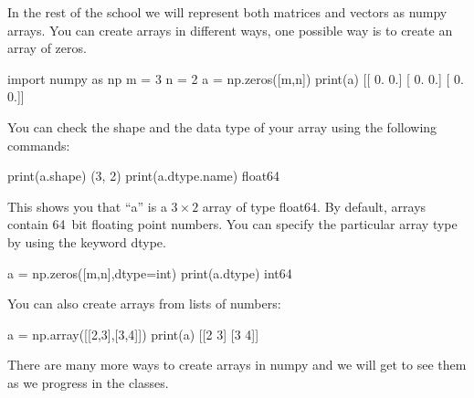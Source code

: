 \begin{exercise}
In the rest of the school we will represent both matrices and vectors as numpy arrays. You can create arrays in different ways, one possible way is to create an array of zeros.
\begin{python}
import numpy as np
m = 3
n = 2
a = np.zeros([m,n])
print(a)
[[ 0.  0.]
 [ 0.  0.]
 [ 0.  0.]]
\end{python}

\noindent You can check the shape and the data type of your array using the following commands:
\begin{python}
print(a.shape)
(3, 2)
print(a.dtype.name)
float64
\end{python}
This shows you that ``a'' is a $3 \times 2$ array of type float64. By default, arrays contain 64~bit\footnotemark{} floating point numbers. You can specify the particular array type by using the keyword dtype.

\begin{python}
a = np.zeros([m,n],dtype=int)
print(a.dtype)
int64
\end{python}

\smallskip

\noindent You can also create arrays from lists of numbers:
\begin{python}
a = np.array([[2,3],[3,4]])
print(a)
[[2 3]
 [3 4]]
\end{python}

There are many more ways to create arrays in numpy and we will get to see them as we progress in the classes.

\end{exercise}

